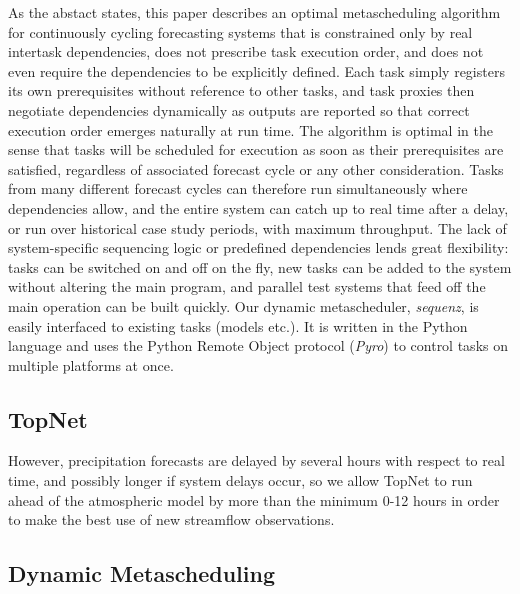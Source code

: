 \documentclass[11pt,a4paper]{article}
\begin{document}
As the abstact states, this paper describes an optimal metascheduling
algorithm for continuously cycling forecasting systems that is
constrained only by real intertask dependencies, does not prescribe task
execution order, and does not even require the dependencies to be
explicitly defined. Each task simply registers its own prerequisites
without reference to other tasks, and task proxies then negotiate
dependencies dynamically as outputs are reported so that correct
execution order emerges naturally at run time. The algorithm is optimal
in the sense that tasks will be scheduled for execution as soon as their
prerequisites are satisfied, regardless of associated forecast cycle or
any other consideration.  Tasks from many different forecast cycles can
therefore run simultaneously where dependencies allow, and the entire
system can catch up to real time after a delay, or run over historical
case study periods, with maximum throughput. The lack of system-specific
sequencing logic or predefined dependencies lends great flexibility:
tasks can be switched on and off on the fly, new tasks can be added to
the system without altering the main program, and parallel test systems
that feed off the main operation can be built quickly. Our dynamic
metascheduler, {\em sequenz}, is easily interfaced to existing tasks
(models etc.). It is written in the Python language and uses the Python
Remote Object protocol ({\em Pyro}) to control tasks on multiple
platforms at once. 

\subsection{TopNet}

However, precipitation forecasts are delayed by several hours with
respect to real time, and possibly longer if system delays occur, so we
allow TopNet to run ahead of the atmospheric model by more than the
minimum 0-12 hours in order to make the best use of new streamflow
observations.  

\subsection{Dynamic Metascheduling}
\end{document}

